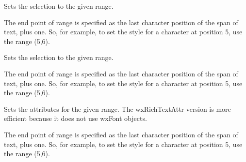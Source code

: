 \label{wxrichtextctrlsetselection}


Sets the selection to the given range.

The end point of range is specified as the last character position of the span of text, plus one.
So, for example, to set the style for a character at position 5, use the range (5,6).

\label{wxrichtextctrlsetselectionrange}


Sets the selection to the given range.

The end point of range is specified as the last character position of the span of text, plus one.
So, for example, to set the style for a character at position 5, use the range (5,6).

\label{wxrichtextctrlsetstyle}




Sets the attributes for the given range. The wxRichTextAttr version is more efficient
because it does not use wxFont objects.

The end point of range is specified as the last character position of the span of text, plus one.
So, for example, to set the style for a character at position 5, use the range (5,6).

\label{wxrichtextctrlsetstyleex}




